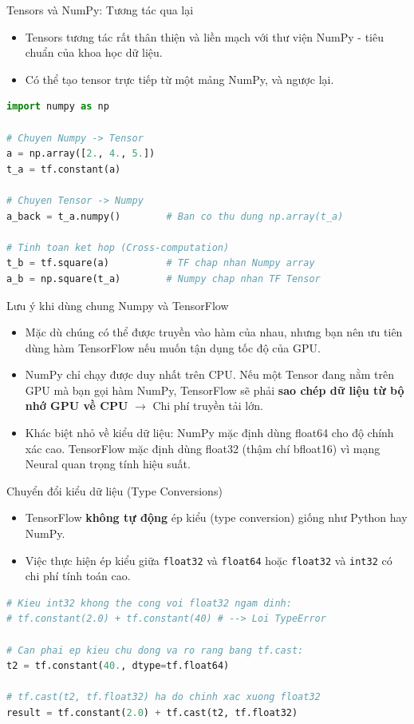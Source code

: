 \documentclass[aspectratio=169]{beamer}
\begin{document}
\begin{frame}[fragile]{Tensors và NumPy: Tương tác qua lại}
    \begin{itemize}
        \item Tensors tương tác rất thân thiện và liền mạch với thư viện NumPy - tiêu chuẩn của khoa học dữ liệu.
        \item Có thể tạo tensor trực tiếp từ một mảng NumPy, và ngược lại.
    \end{itemize}
    \begin{lstlisting}[language=Python]
import numpy as np

# Chuyen Numpy -> Tensor
a = np.array([2., 4., 5.])
t_a = tf.constant(a)

# Chuyen Tensor -> Numpy
a_back = t_a.numpy()        # Ban co thu dung np.array(t_a)

# Tinh toan ket hop (Cross-computation)
t_b = tf.square(a)          # TF chap nhan Numpy array 
a_b = np.square(t_a)        # Numpy chap nhan TF Tensor 
    \end{lstlisting}
\end{frame}

\begin{frame}[fragile]{Lưu ý khi dùng chung Numpy và TensorFlow}
    \begin{itemize}
        \item Mặc dù chúng có thể được truyền vào hàm của nhau, nhưng bạn nên ưu tiên dùng hàm TensorFlow nếu muốn tận dụng tốc độ của GPU.
        \item NumPy chỉ chạy được duy nhất trên CPU. Nếu một Tensor đang nằm trên GPU mà bạn gọi hàm NumPy, TensorFlow sẽ phải \textbf{sao chép dữ liệu từ bộ nhớ GPU về CPU} $\rightarrow$ Chi phí truyền tải lớn.
        \item Khác biệt nhỏ về kiểu dữ liệu: NumPy mặc định dùng float64 cho độ chính xác cao. TensorFlow mặc định dùng float32 (thậm chí bfloat16) vì mạng Neural quan trọng tính hiệu suất.
    \end{itemize}
\end{frame}

\begin{frame}[fragile]{Chuyển đổi kiểu dữ liệu (Type Conversions)}
    \begin{itemize}
        \item TensorFlow \textbf{không tự động} ép kiểu (type conversion) giống như Python hay NumPy.
        \item Việc thực hiện ép kiểu giữa \texttt{float32} và \texttt{float64} hoặc \texttt{float32} và \texttt{int32} có chi phí tính toán cao.
    \end{itemize}
    \begin{lstlisting}[language=Python]
# Kieu int32 khong the cong voi float32 ngam dinh:
# tf.constant(2.0) + tf.constant(40) # --> Loi TypeError

# Can phai ep kieu chu dong va ro rang bang tf.cast:
t2 = tf.constant(40., dtype=tf.float64)

# tf.cast(t2, tf.float32) ha do chinh xac xuong float32
result = tf.constant(2.0) + tf.cast(t2, tf.float32)
    \end{lstlisting}
\end{frame}
\end{document}

